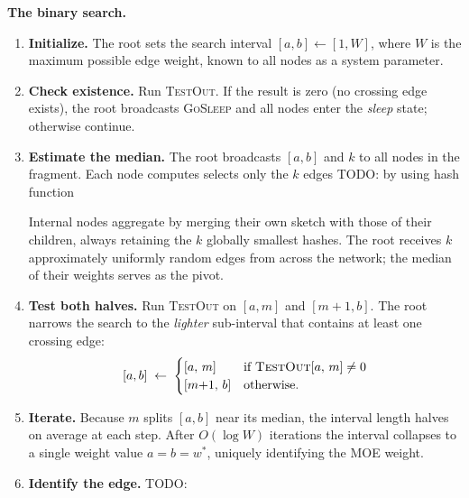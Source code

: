 \documentclass{memoir}
\begin{document}
\noindent\textbf{The binary search.}
\begin{enumerate}
 
    \item \textbf{Initialize.}
          The root sets the search interval $[a,b] \gets [1, W]$, where $W$ is the
          maximum possible edge weight, known to all nodes as a system parameter.
 
    \item \textbf{Check existence.}
          Run \textsc{TestOut}.
          If the result is zero (no crossing edge exists), the root broadcasts
          \textsc{GoSleep} and all nodes enter the \emph{sleep} state; otherwise continue.
 
    \item \textbf{Estimate the median.}
          The root broadcasts $[a,b]$ and $k$ to all nodes in the fragment.
          Each node computes selects only the $k$ edges TODO: by using hash function
          
          Internal nodes aggregate by merging their own sketch with those of their
          children, always retaining the $k$ globally smallest hashes.
          The root receives $k$ approximately uniformly random edges from across the
          network; the median of their weights serves as the pivot.

 
    \item \textbf{Test both halves.}
          Run \textsc{TestOut} on $[a,m]$ and $[m{+}1,b]$. The root narrows the search to
          the \emph{lighter} sub-interval that contains at least one crossing edge:
          \[
              [a,b] \;\gets\;
              \begin{cases}
                  [a,\,m]     & \text{if } \textsc{TestOut} [a,\,m] \neq 0 \\
                  [m{+}1,\,b] & \text{otherwise.}
              \end{cases}
          \]
 
    \item \textbf{Iterate.}
          Because $m$ splits $[a,b]$ near its median, the interval length halves on
          average at each step.
          After $O(\log W)$ iterations the interval collapses to a single weight value
          $a = b = w^*$, uniquely identifying the MOE weight.
 
    \item \textbf{Identify the edge.}
          TODO:
 
\end{enumerate}
\end{document}
